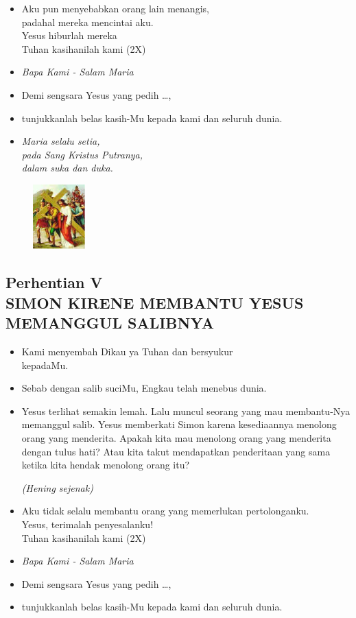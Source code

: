 \documentclass[a5paper,headsepline,titlepage,11pt,nnormalheadings,DIVcalc]{scrbook}
\newcommand{\BU}[1]{\begin{itemize} \item[U:] #1 \end{itemize}}
\newcommand{\BP}[1]{\begin{itemize} \item[P:] #1 \end{itemize}}
\newcommand{\kamiMenyembah}{\BP{ Kami menyembah Dikau ya Tuhan dan bersyukur\\kepadaMu.}
\BU{ Sebab dengan salib suciMu, Engkau telah menebus dunia.}
}
\newcommand{\kasihanilahKami}{\BP{Demi sengsara Yesus yang pedih \ldots,}
\BU{tunjukkanlah belas kasih-Mu kepada kami dan seluruh dunia.}}
\def\hening{\par \textit{(Hening sejenak)}}
\begin{document}
\BU{Aku pun menyebabkan orang lain menangis,\\ padahal mereka mencintai aku.\\ Yesus hiburlah mereka\\
Tuhan kasihanilah kami (2X)
}

\large\begin{itemize}\item[~]\it{Bapa Kami - Salam Maria}\end{itemize}\normalsize
\kasihanilahKami

\begin{itemize}
\item[5.] \it{Maria selalu setia,\\ 
	pada Sang Kristus Putranya,\\ 
	dalam suka dan duka.}
\end{itemize}

\begin{figure}
\includegraphics[width=2cm]{jalansalib_files/05_small.jpg}
\end{figure}
\subsection*{Perhentian V\\
SIMON KIRENE MEMBANTU YESUS\\MEMANGGUL SALIBNYA}

\kamiMenyembah
\BP{Yesus terlihat semakin lemah. Lalu muncul seorang yang mau membantu-Nya memanggul salib. Yesus memberkati Simon karena kesediaannya menolong orang yang menderita. Apakah kita mau menolong orang yang menderita dengan tulus hati? Atau kita takut mendapatkan penderitaan yang sama ketika kita hendak menolong orang itu?
\hening
}

\BU{Aku tidak selalu membantu orang yang memerlukan pertolonganku.\\ Yesus, terimalah penyesalanku!\\
Tuhan kasihanilah kami (2X)
}


\large\begin{itemize}\item[~]\it{Bapa Kami - Salam Maria}\end{itemize}\normalsize
\kasihanilahKami
\end{document}
